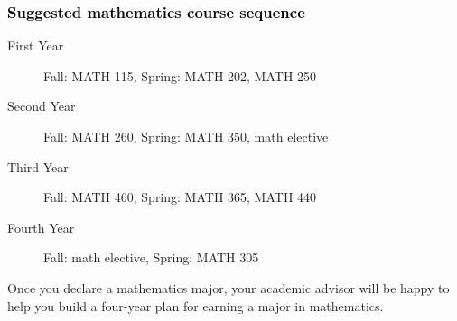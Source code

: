 \documentclass[10pt]{article}
\begin{document}
\subsubsection*{\textcolor{black}{Suggested mathematics course sequence}}

\begin{description}
   \item[\phantom{xxx} First  Year] Fall: MATH 115, Spring:  MATH 202, MATH 250
      \item[\phantom{xxx} Second Year]  Fall: MATH 260,  Spring: MATH 350, math elective
     \item[\phantom{xxx} Third Year]  Fall: MATH 460, Spring: MATH 365, MATH 440
     \item[\phantom{xxx} Fourth Year]  Fall: math elective, Spring: MATH 305
 \end{description}
  \vspace{0.1in}

 \noindent Once you declare a mathematics major, your academic advisor will be happy to help you build a four-year plan for earning a major in mathematics.

   \vspace{0.1in}
\end{document}
